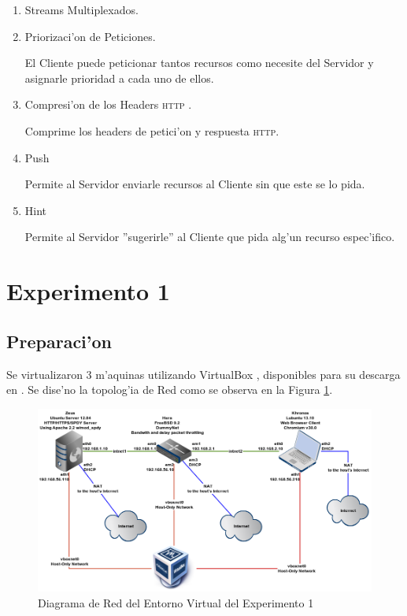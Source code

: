 \documentclass[a4paper,11pt,twocolumn]{article}
\begin{document}
\begin{enumerate}

\item Streams Multiplexados.

\item Priorizaci'on de Peticiones.

El Cliente puede peticionar tantos recursos como necesite del Servidor y asignarle prioridad a cada uno de ellos.

\item Compresi'on de los Headers \textsc{http} \cite{headersHTTP}.

Comprime los headers de petici'on y respuesta \textsc{http}.

\item Push

Permite al Servidor enviarle recursos al Cliente sin que este se lo pida.

\item Hint

Permite al Servidor ''sugerirle'' al Cliente que pida alg'un recurso espec'ifico.

\end{enumerate}

\section{Experimento 1}
\label{experimento1}
\subsection{Preparaci'on}

Se virtualizaron 3 m'aquinas utilizando VirtualBox \cite{virtualBox}, disponibles para su descarga en \cite{maqVirtuales}.
Se dise'no la topolog'ia de Red como se observa en la Figura \ref{diagramavms}.

\begin{figure}[ht]
  \centering\includegraphics[scale=0.5]{diagramavms}
  \caption{Diagrama de Red del Entorno Virtual del Experimento 1}
  \label{diagramavms}
\end{figure}
\end{document}
